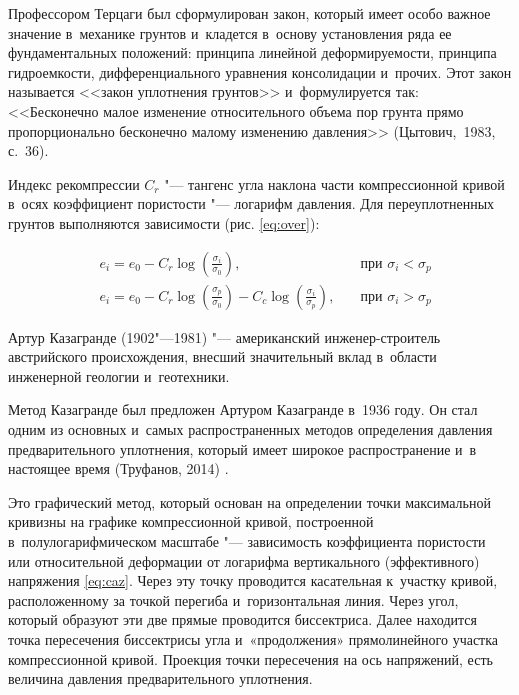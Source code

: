  Профессором Терцаги был сформулирован закон, который имеет особо важное значение в~механике грунтов и~кладется в~основу установления ряда ее фундаментальных положений: 
 принципа линейной деформируемости, 
 принципа гидроемкости, 
 дифференциального уравнения консолидации и~прочих.
 Этот закон называется <<закон уплотнения грунтов>> и~формулируется так: <<Бесконечно малое изменение относительного объема пор грунта прямо пропорционально бесконечно малому изменению давления>> (Цытович,~1983, с.~36)\cite[36]{cytovich1983}.

 Индекс рекомпрессии $C_r$ "--- тангенс угла наклона части компрессионной кривой в~осях коэффициент пористости "--- логарифм давления.
 Для переуплотненных грунтов выполняются зависимости (рис. \ref{eq:over}):

\begin{subequations}
  \label{eq:over}
  \begin{align}
    \label{eq:cr}
    & e_i = e_0 - C_r\log \left(\frac{\sigma_i}{\sigma_0}\right), \quad &\text{при } \sigma_i<\sigma_p \\
    \label{eq:crcc}
    & e_i = e_0 - C_r\log \left(\frac{\sigma_p}{\sigma_0}\right) - C_c\log \left(\frac{\sigma_i}{\sigma_p}\right), \quad &\text{при } \sigma_i>\sigma_p
  \end{align}
\end{subequations}



 
 Артур Казагранде (1902"---1981) "--- американский инженер-строитель австрийского происхождения, внесший значительный вклад в~области инженерной геологии и~геотехники. 
 
 Метод Казагранде был предложен Артуром Казагранде в~1936 году.
 Он стал одним из основных и~самых распространенных методов определения давления предварительного уплотнения, который имеет широкое распространение и~в настоящее время (Труфанов, 2014) \cite{truf2014}.
 
    

 Это графический метод, который основан на определении точки максимальной кривизны на графике компрессионной кривой, построенной в~полулогарифмическом масштабе "--- зависимость коэффициента пористости или относительной деформации от логарифма вертикального (эффективного) напряжения \ref{eq:caz}. 
 Через эту точку проводится касательная к~участку кривой, расположенному за точкой перегиба и~горизонтальная линия. 
 Через угол, который образуют эти две прямые проводится биссектриса. 
 Далее находится точка пересечения биссектрисы угла и~«продолжения» прямолинейного участка компрессионной кривой. Проекция точки пересечения на ось напряжений, есть величина давления предварительного уплотнения. 

